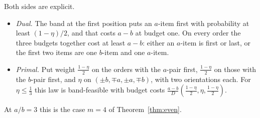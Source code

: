 Both sides are explicit.
\begin{itemize}
\item \emph{Dual.} The band at the first position puts an $a$-item first with probability at
least $(1-\eta)/2$, and that costs $a-b$ at budget one. On every order the three budgets
together cost at least $a-b$: either an $a$-item is first or last, or the first two items are one
$b$-item and one $a$-item.
\item \emph{Primal.} Put weight $\frac{1-\eta}2$ on the orders with the $a$-pair first,
$\frac{1-\eta}2$ on those with the $b$-pair first, and $\eta$ on
$(\pm b,\mp a,\pm a,\mp b)$, with two orientations each. For $\eta\le\frac13$ this law is
band-feasible with budget costs $\frac{a-b}{D}(\frac{1-\eta}2,\eta,\frac{1-\eta}2)$.
\end{itemize}
At $a/b=3$ this is the case $m=4$ of Theorem~\ref{thm:even}.

